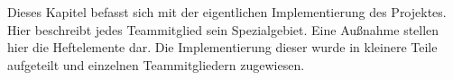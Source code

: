 
Dieses Kapitel befasst sich mit der eigentlichen Implementierung des Projektes. Hier beschreibt jedes Teammitglied sein Spezialgebiet. Eine Außnahme stellen hier die Heftelemente dar. Die Implementierung dieser wurde in kleinere Teile aufgeteilt und einzelnen Teammitgliedern zugewiesen.